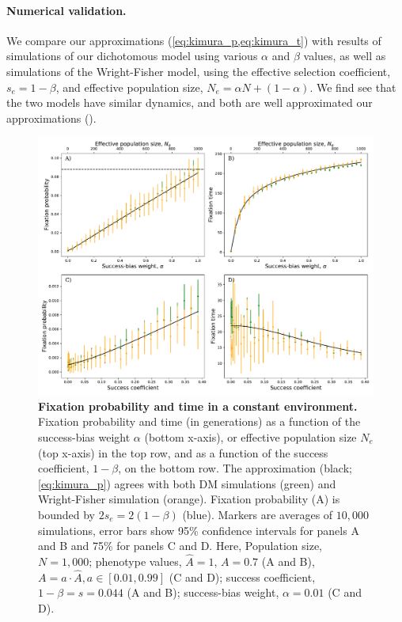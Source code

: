 \documentclass[12pt]{extarticle}
\begin{document}
\paragraph{Numerical validation.}
We compare our approximations (\cref{eq:kimura_p,eq:kimura_t}) with results of simulations of our dichotomous model using various $\alpha$ and $\beta$ values, as well as simulations of the Wright-Fisher model, using the effective selection coefficient, $s_e=1-\beta$, and effective population size, $N_e=\alpha N + (1-\alpha)$. 
We find see that the two models have similar dynamics, and both are well approximated our approximations ().


\begin{figure}[h]
    \includegraphics[width=\linewidth]{../figures/final/kimura_var.pdf}
  \caption{\textbf{Fixation probability and time in a constant environment.}
  Fixation probability and time (in generations) as a function of the success-bias weight $\alpha$ (bottom x-axis), or effective population size $N_e$ (top x-axis) in the top row, and as a function of the success coefficient, $1-\beta$, on the bottom row. %
  The approximation (black; \cref{eq:kimura_p}) agrees with both DM simulations (green) and Wright-Fisher simulation (orange).
  Fixation probability (A) is bounded by $2s_e=2(1-\beta)$ (blue).
  Markers are averages of $10,000$ simulations, error bars show 95\% confidence intervals for panels A and B and 75\% for panels C and D.
   Here, Population size, $N=1,000$; phenotype values, $\hat{A}=1$, $A=0.7$ (A and B), $A=a\cdot \hat{A}, a \in [0.01,0.99]$ (C and D); success coefficient, $1-\beta=s=0.044$ (A and B); success-bias weight, $\alpha=0.01$ (C and D).}
  \label{fig:var_alpha}
\end{figure}
\end{document}
